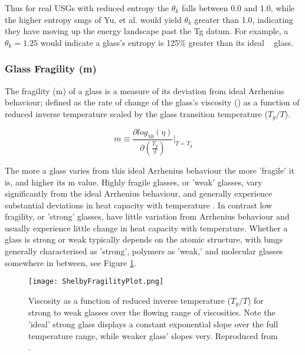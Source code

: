 \documentclass[a4paper,12pt,oneside]{report}%
\begin{document}
Thus for real USGs with reduced entropy  the $\theta_{k}$ falls between 0.0 and 1.0, while the higher entropy \glspl{smg} of Yu, et al. \cite{Yu2013} would yield $\theta_{k}$ greater than 1.0, indicating they have moving up the energy landscape past the \gls{Tg} datum. For example, a $\theta_{k}=1.25$ would indicate a glass's entropy is 125\% greater than its ideal \Tk~ glass.

\subsubsection{Glass Fragility (m)}
The fragility (m)  of a glass is a measure of its deviation from ideal Arrhenius behaviour; defined as the rate of change of the glass's viscosity (\n) as a function of reduced inverse temperature scaled by the glass transition temperature ($T_{g}/T$).

\begin{equation}
m \equiv 
\frac{\partial log_{10} (\eta)}
{\partial (\frac{T_{g}} {T})}
\biggr|_{T=T_{g}}
\label{equ:Fragility}
\end{equation}

The more a glass varies from this ideal Arrhenius behaviour the more 'fragile' it is, and higher its m value. Highly fragile glasses, or 'weak' glasses, vary significantly from the ideal Arrhenius behaviour, and generally experience substantial deviations in heat capacity with temperature \cite{Shelby2005, Angell1995}. In contrast low fragility, or 'strong' glasses, have little variation from Arrhenius behaviour and usually experience little change in heat capacity with temperature. Whether a glass is strong or weak typically depends on the atomic structure, with \glspl{bmg} generally characterised as 'strong', polymers as 'weak,' and molecular glasses somewhere in between, see Figure \ref{fig:ShelbyFragPlot}. 

\begin{figure}[htbp]
	\centering
	\texttt{[image: ShelbyFragilityPlot.png]}
	\caption[Viscosity as a function of reduced inverse temperature ($T_{g}/T$) for strong to weak glasses over the flowing range of viscosities. Note the 'ideal' strong glass displays a constant exponential slope over the full temperature range, while weaker glass' slopes very.]{Viscosity as a function of reduced inverse temperature ($T_{g}/T$) for strong to weak glasses over the flowing range of viscosities. Note the 'ideal' strong glass displays a constant exponential slope over the full temperature range, while weaker glass' slopes very. Reproduced from \cite{Shelby2005}.}
	\label{fig:ShelbyFragPlot}
\end{figure}
\end{document}

